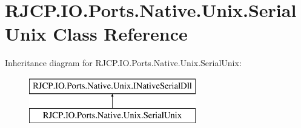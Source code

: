 \hypertarget{class_r_j_c_p_1_1_i_o_1_1_ports_1_1_native_1_1_unix_1_1_serial_unix}{}\section{R\+J\+C\+P.\+I\+O.\+Ports.\+Native.\+Unix.\+Serial\+Unix Class Reference}
\label{class_r_j_c_p_1_1_i_o_1_1_ports_1_1_native_1_1_unix_1_1_serial_unix}
Inheritance diagram for R\+J\+C\+P.\+I\+O.\+Ports.\+Native.\+Unix.\+Serial\+Unix\+:\begin{figure}[H]
\begin{center}
\leavevmode
\includegraphics[height=2.000000cm]{class_r_j_c_p_1_1_i_o_1_1_ports_1_1_native_1_1_unix_1_1_serial_unix}
\end{center}
\end{figure}
